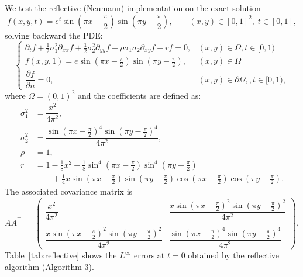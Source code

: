 \documentclass[11pt]{article}
\theoremstyle{mythm}
\theoremstyle{definition}
\begin{document}
	We test the reflective (Neumann) implementation on the exact solution
	\[
	f(x,y,t) = e^{t} \sin\left(\pi x - \frac{\pi}{2}\right) \sin\left(\pi y - \frac{\pi}{2}\right), \qquad (x,y) \in [0,1]^2, \; t \in [0,1],
	\]
	solving backward the PDE:
	\begin{equation*} 
		\label{eq:exp-reflective}
		\begin{cases}
			\displaystyle
			\partial_t f + \frac{1}{2} \sigma_1^2 \partial_{xx} f + \frac{1}{2} \sigma_2^2 \partial_{yy} f + \rho \sigma_1 \sigma_2 \partial_{xy} f  - r f = 0,&(x,y)\in\Omega,t\in[0,1) \\[6pt]
			f(x,y,1) = e \sin\left(\pi x - \frac{\pi}{2}\right) \sin\left(\pi y - \frac{\pi}{2}\right),&(x,y)\in\Omega \\[4pt]
			\dfrac{\partial f}{\partial n}=0 ,&(x,y)\in\partial\Omega,,t\in[0,1),
		\end{cases}
	\end{equation*}
	where $\Omega=(0,1)^2$ and the coefficients are defined as:
	\[
	\begin{aligned}
		\sigma_1^2 &= \dfrac{x^2}{4\pi^2}, \\
		\sigma_2^2 &= \dfrac{\sin(\pi x - \frac{\pi}{2})^4 \sin(\pi y - \frac{\pi}{2})^4}{4\pi^2}, \\
		\rho &= 1, \\
		r &= 1 - \frac{1}{8}x^2- \frac{1}{8}\sin^4\left(\pi x - \frac{\pi}{2}\right) \sin^4\left(\pi y - \frac{\pi}{2}\right)\\&\qquad + \frac{1}{4}x \sin\left(\pi x - \frac{\pi}{2}\right) \sin\left(\pi y - \frac{\pi}{2}\right) \cos\left(\pi x - \frac{\pi}{2}\right) \cos\left(\pi y - \frac{\pi}{2}\right).
	\end{aligned}
	\]
	The associated covariance matrix is
	\[
	A A^\top = \
	\begin{pmatrix}
		\dfrac{x^2}{4\pi^2} &\dfrac{x\sin(\pi x - \frac{\pi}{2})^2 \sin(\pi y - \frac{\pi}{2})^2}{4\pi^2} \\[2pt]
		\\
		\dfrac{x\sin(\pi x - \frac{\pi}{2})^2 \sin(\pi y - \frac{\pi}{2})^2}{4\pi^2} &\dfrac{\sin(\pi x - \frac{\pi}{2})^4 \sin(\pi y - \frac{\pi}{2})^4}{4\pi^2}
	\end{pmatrix},
	\]
	Table~\ref{tab:reflective} shows the \(L^\infty\) errors at \(t = 0\) obtained by the reflective algorithm (Algorithm 3).
	
\end{document}
